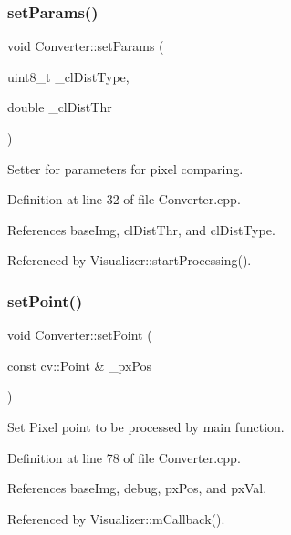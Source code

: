\subsubsection{\texorpdfstring{setParams()}{setParams()}}
{\footnotesize\ttfamily void Converter\+::set\+Params (\begin{DoxyParamCaption}\item[{uint8\+\_\+t}]{\+\_\+cl\+Dist\+Type,  }\item[{double}]{\+\_\+cl\+Dist\+Thr }\end{DoxyParamCaption})}



Setter for parameters for pixel comparing. 



Definition at line 32 of file Converter.\+cpp.



References base\+Img, cl\+Dist\+Thr, and cl\+Dist\+Type.



Referenced by Visualizer\+::start\+Processing().

\mbox{\label{class_converter_acc71625f678e032dbdd3c17e58580e4f}} 
\subsubsection{\texorpdfstring{setPoint()}{setPoint()}}
{\footnotesize\ttfamily void Converter\+::set\+Point (\begin{DoxyParamCaption}\item[{const cv\+::\+Point \&}]{\+\_\+px\+Pos }\end{DoxyParamCaption})}



Set Pixel point to be processed by main function. 



Definition at line 78 of file Converter.\+cpp.



References base\+Img, debug, px\+Pos, and px\+Val.



Referenced by Visualizer\+::m\+Callback().

\mbox{\label{class_converter_afccc063ddf93903141b1fb629a7e1252}} 
